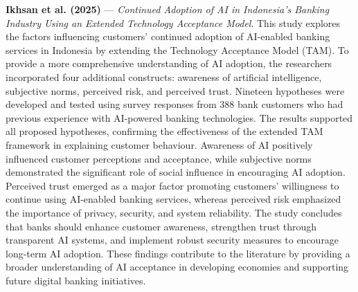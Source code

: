 \documentclass[conference]{IEEEtran}
\begin{document}
\noindent\textbf{Ikhsan et al. (2025)}\nocite{Mongolia2025} --- \emph{Continued Adoption of AI in Indonesia's Banking Industry Using an Extended Technology Acceptance Model}. This study explores the factors influencing customers' continued adoption of AI-enabled banking services in Indonesia by extending the Technology Acceptance Model (TAM). To provide a more comprehensive understanding of AI adoption, the researchers incorporated four additional constructs: awareness of artificial intelligence, subjective norms, perceived risk, and perceived trust. Nineteen hypotheses were developed and tested using survey responses from 388 bank customers who had previous experience with AI-powered banking technologies. The results supported all proposed hypotheses, confirming the effectiveness of the extended TAM framework in explaining customer behaviour. Awareness of AI positively influenced customer perceptions and acceptance, while subjective norms demonstrated the significant role of social influence in encouraging AI adoption. Perceived trust emerged as a major factor promoting customers' willingness to continue using AI-enabled banking services, whereas perceived risk emphasized the importance of privacy, security, and system reliability. The study concludes that banks should enhance customer awareness, strengthen trust through transparent AI systems, and implement robust security measures to encourage long-term AI adoption. These findings contribute to the literature by providing a broader understanding of AI acceptance in developing economies and supporting future digital banking initiatives.

\par\medskip
\end{document}
